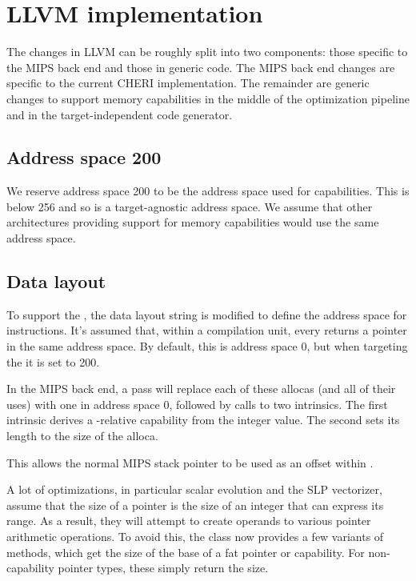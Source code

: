 \chapter{LLVM implementation}
\label{chap:llvm-implementation}

The changes in LLVM can be roughly split into two components: those specific to the MIPS back end and those in generic code.
The MIPS back end changes are specific to the current CHERI implementation.
The remainder are generic changes to support memory capabilities in the middle of the optimization pipeline and in the target-independent code generator.

\section{Address space 200}

We reserve address space 200 to be the address space used for capabilities.
This is below 256 and so is a target-agnostic address space.
We assume that other architectures providing support for memory capabilities would use the same address space.

\section{Data layout}
\label{sec:datalayout}

To support the \sandboxABI{}, the data layout string is modified to define the address space for  instructions.
It's assumed that, within a compilation unit, every  returns a pointer in the same address space.
By default, this is address space 0, but when targeting the \sandboxABI{} it is set to 200.

In the MIPS back end, a pass will replace each of these allocas (and all of their uses) with one in address space 0, followed by calls to two intrinsics.
The first intrinsic derives a -relative capability from the integer value.
The second sets its length to the size of the alloca.

This allows the normal MIPS stack pointer to be used as an offset within .

A lot of optimizations, in particular scalar evolution and the SLP vectorizer, assume that the size of a pointer is the size of an integer that can express its range.
As a result, they will attempt to create  operands to various pointer arithmetic operations.
To avoid this, the  class now provides a few variants of  methods, which get the size of the base of a fat pointer or capability.
For non-capability pointer types, these simply return the size.

